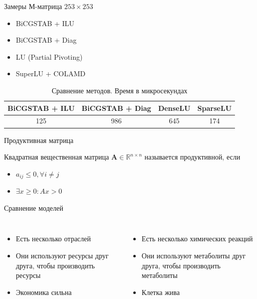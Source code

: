 \documentclass[aspectratio=169]{beamer}
\begin{document}
\begin{frame}{Замеры}
М-матрица $253 \times 253$
\begin{itemize}
	\item BiCGSTAB + ILU
	\item BiCGSTAB + Diag
	\item LU (Partial Pivoting)
	\item SuperLU + COLAMD
\end{itemize}
\begin{table}[b]
	\centering
	\caption{Сравнение методов. Время в микросекундах\label{methods_benchmark}}
	\begin{tabular}{c|c|c|c}
		\hline
		BiCGSTAB + ILU & BiCGSTAB + Diag & DenseLU & SparseLU\\
		\hline
		125 & 986 & 645 & 174\\
	\end{tabular}
\end{table}
\end{frame}

\begin{frame}{Продуктивная матрица}
\begin{theorem}[Леонтьев, 1928]
	Квадратная вещественная матрица $\mathbf{A} \in \mathbb{R}^{n \times n}$ называется продуктивной, если
	\begin{itemize}
		\item $a_{ij} \leq 0, \forall i \neq j$
		\item $\exists x \geq 0 : Ax > 0$
	\end{itemize}
\end{theorem}
\end{frame}

\begin{frame}{Сравнение моделей}
\begin{columns}[T]
	\begin{itemize}
		\item Есть несколько отраслей
		\item Они используют ресурсы друг друга, чтобы производить ресурсы
		\item Экономика сильна
	\end{itemize}

	\begin{itemize}
		\item Есть несколько химических реакций
		\item Они используют метаболиты друг друга, чтобы производить метаболиты
		\item Клетка жива
	\end{itemize}
\end{columns}
\end{frame}
\end{document}
